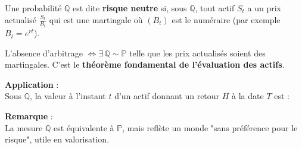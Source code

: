 \begin{f}
	
	Une probabilité $\mathbb{Q}$ est dite \textbf{risque neutre} si, sous $\mathbb{Q}$, 
	tout actif  $S_t$ a un prix actualisé $ \frac{S_t}{B_t}$ qui est une martingale
	où $(B_t)$ est le numéraire (par exemple $B_t = e^{rt}$).
	
	L'absence d'arbitrage $\iff \exists\, \mathbb{Q} \sim \mathbb{P}$ telle que les prix actualisés soient des martingales.
	C’est le \textbf{théorème fondamental de l’évaluation des actifs}.
	
	\textbf{Application} :\\
	Sous $\mathbb{Q}$, la valeur à l’instant $t$ d’un actif donnant un retour $H$ à la date $T$ est :
	
	\textbf{Remarque} :\\
	La mesure $\mathbb{Q}$ est équivalente à $\mathbb{P}$, mais reflète un monde "sans préférence pour le risque", utile en valorisation.
	
\end{f}
\newcolumn

